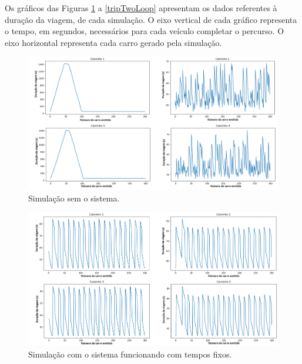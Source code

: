 Os gráficos das Figuras \ref{tripNoTL} a \ref{tripTwoLoop} apresentam os dados referentes à duração da viagem, de cada simulação. O eixo vertical de cada gráfico representa o tempo, em segundos, necessários para cada veículo completar o percurso. O eixo horizontal representa cada carro gerado pela simulação.

\begin{figure}[H]
    \begin{center}
    \includegraphics[width=1\textwidth]{figuras/Trip_Duration_No_TrafficLight.PNG}
    \end{center}
    \caption[Duração da viagem, cenário 1]{Simulação sem o sistema.}
    \label{tripNoTL}
\end{figure}

\begin{figure}[H]
    \begin{center}
    \includegraphics[width=1\textwidth]{figuras/Trip_Duration_With_TrafficLight.PNG}
    \end{center}
    \caption[Duração da viagem, cenário 2]{Simulação com o sistema funcionando com tempos fixos.}
    \label{tripWithTL}
\end{figure}

